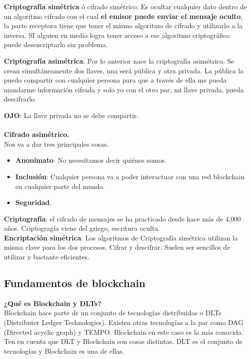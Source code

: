 \documentclass[a4paper,12pt]{lib/pub}
\begin{document}
\textbf{Criptografía simétrica} ó cifrado simétrico: Es ocultar cualquier dato dentro de un algoritmo cifrado con el cual \textbf{el emisor puede enviar el mensaje oculto}, la parte receptora tiene que tener el mismo algoritmo de cifrado y utilizarlo a la inversa. SI alguien en medio logra tener acceso a ese algoritmo criptográfico puede desencriptarlo sin problema.

\textbf{Criptografía asimétrica}: Por lo anterior nace la criptografía asimétrica. Se crean simultáneamente dos llaves, una será pública y otra privada. La pública la puedo compartir con cualquier persona para que a través de ella me pueda mandarme información cifrada y solo yo con el otro par, mi llave privada, pueda descifrarlo.

\textbf{OJO}: La llave privada no se debe compartir.\\\\
\textbf{Cifrado asimétrico.}\\
Nos va a dar tres principales cosas.
\begin{itemize}	
\item \textbf{Anonimato}: No necesitamos decir quiénes somos.
\item \textbf{Inclusión}: Cualquier persona va a poder interactuar con una red blockchain en cualquier parte del mundo.
\item \textbf{Seguridad}.
\end{itemize}

\textbf{Criptografía}: el cifrado de mensajes se ha practicado desde hace más de 4,000 años. Criptogragía viene del griego, escritura oculta.\\

\textbf{Encriptación simétrica}: Los algoritmos de Criptografía simétrica utilizan la misma clave para los dos procesos. Cifrar y descifrar. Suelen ser sencillos de utilizar y bastante eficientes.

\subsection{Fundamentos de blockchain}
\textbf{¿Qué es Blockchain y DLTs?}\\
Blockchain hace parte de un conjunto de tecnologías distribuidas o DLTs (Distributer Ledger Technologies). Existen otras tecnologías a la par como DAG (Directed acyclic graph) y TEMPO. Blockchain en este caso es la más conocida. Ten en cuenta que DLT y Blockchain son cosas distintas. DLT es el conjunto de tecnologías y Blockchain es una de ellas.\\
\end{document}
